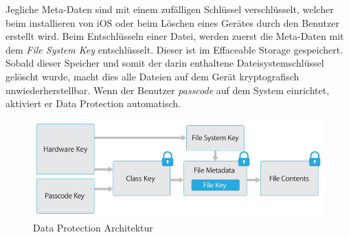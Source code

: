 		Jegliche Meta-Daten sind mit einem zufälligen Schlüssel verschlüsselt, welcher
		beim installieren von iOS oder beim Löschen eines Gerätes durch den Benutzer
		erstellt wird. Beim Entschlüsseln einer Datei, werden zuerst die Meta-Daten
		mit dem \textsl{File System Key} entschlüsselt. Dieser ist im Effaceable Storage
		gespeichert.
		Sobald dieser Speicher und somit der darin enthaltene Dateisystemschlüssel
		gelöscht wurde, macht dies alle Dateien auf dem Gerät kryptografisch
		unwiederherstellbar. Wenn der Benutzer \textsl{passcode} auf dem System
		einrichtet, aktiviert er Data Protection automatisch.
		\begin{figure}[h]
			\centering
			\includegraphics[width=0.9\linewidth]{ios/media/data-protection.jpg}
			\caption{Data Protection Architektur 
			\cite[S.10]{iOSSecurityApr2015}}
			\label{fig:data-protection}
		\end{figure}
